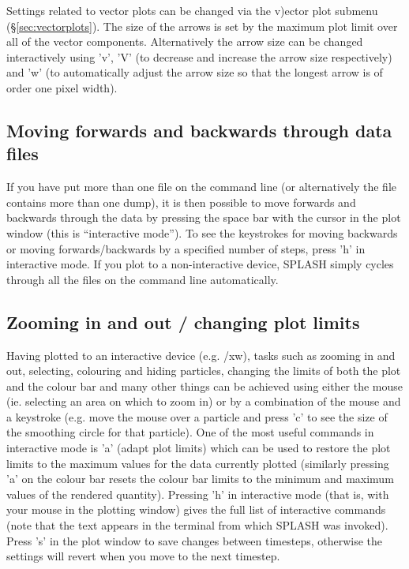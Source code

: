 \documentclass[a4paper,11pt]{article}
\begin{document}
 Settings related to vector plots can be changed via the v)ector plot submenu (\S\ref{sec:vectorplots}). The size of the arrows is set by the maximum plot limit over all of the vector components. Alternatively the arrow size can be changed interactively using 'v', 'V' (to decrease and increase the arrow size respectively) and 'w' (to automatically adjust the arrow size so that the longest arrow is of order one pixel width). 

\subsection{Moving forwards and backwards through data files}
 If you have put more than one file on the command line (or alternatively the file contains more than one dump), it is then possible to move forwards and backwards through the data by pressing the space bar with the cursor in the plot window (this is ``interactive mode''). To see the keystrokes for moving backwards or moving forwards/backwards by a specified number of steps, press 'h' in interactive mode. If you plot to a non-interactive device, SPLASH simply cycles through all the files on the command line automatically.

\subsection{Zooming in and out / changing plot limits}
 Having plotted to an interactive device (e.g. /xw), tasks such as zooming in and out, selecting, colouring and hiding particles, changing the limits of both the plot and the colour bar and many other things can be achieved using either the mouse (ie. selecting an area on which to zoom in) or by a combination of the mouse and a keystroke (e.g. move the mouse over a particle and press 'c' to see the size of the smoothing circle for that particle). One of the most useful commands in interactive mode is 'a' (adapt plot limits) which can be used to restore the plot limits to the maximum values for the data currently plotted (similarly pressing 'a' on the colour bar resets the colour bar limits to the minimum and maximum values of the rendered quantity). Pressing 'h' in interactive mode (that is, with your mouse in the plotting window) gives the full list of interactive commands (note that the text appears in the terminal from which SPLASH was invoked). Press 's' in the plot window to save changes between timesteps, otherwise the settings will revert when you move to the next timestep. 
 
\end{document}
